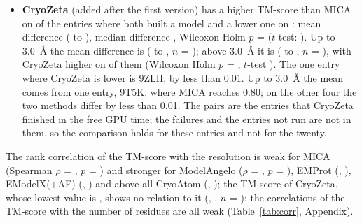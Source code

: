 \begin{itemize}
\item \textbf{CryoZeta} (added after the first version) has a higher TM-score than MICA on \HigherTmCryozeta{} of the \NPairsTmCryozeta{} entries where both built a model and a lower one on \LowerTmCryozeta{}: mean difference \DiffTmCryozeta{} (\DiffLoTmCryozeta{} to \DiffHiTmCryozeta{}), median difference \MedDiffTmCryozeta{}, Wilcoxon Holm $p$ = \PwHolmTmCryozeta{} ($t$-test: \PtHolmTmCryozeta{}). Up to 3.0~\AA{} the mean difference is \DiffTmCryozetaLow{} (\DiffLoTmCryozetaLow{} to \DiffHiTmCryozetaLow{}, $n$ = \NPairsTmCryozetaLow{}); above 3.0~\AA{} it is \DiffTmCryozetaHigh{} (\DiffLoTmCryozetaHigh{} to \DiffHiTmCryozetaHigh{}, $n$ = \NPairsTmCryozetaHigh{}), with CryoZeta higher on \HigherTmCryozetaHigh{} of them (Wilcoxon Holm $p$ = \PwHolmTmCryozetaHigh{}, $t$-test \PtHolmTmCryozetaHigh{}). The one entry where CryoZeta is lower is 9ZLH, by less than 0.01. Up to 3.0~\AA{} the mean comes from one entry, 9T5K, where MICA reaches 0.80; on the other four the two methods differ by less than 0.01. The pairs are the entries that CryoZeta finished in the free GPU time; the \NFailedCryozeta{} failures and the \NNotRunCryozeta{} entries not run are not in them, so the comparison holds for these entries and not for the twenty.
\end{itemize}
The rank correlation of the TM-score with the resolution is weak for MICA (Spearman $\rho$ = \RhoResTmMica{}, $p$ = \RhoPResTmMica{}) and stronger for ModelAngelo ($\rho$ = \RhoResTmAngelo{}, $p$ = \RhoPResTmAngelo{}), EMProt (\RhoResTmEmprot{}, \RhoPResTmEmprot{}), EModelX(+AF) (\RhoResTmEmodelx{}, \RhoPResTmEmodelx{}) and above all CryoAtom (\RhoResTmCryoatom{}, \RhoPResTmCryoatom{}); the TM-score of CryoZeta, whose lowest value is \TmMinCryozeta{}, shows no relation to it (\RhoResTmCryozeta{}, \RhoPResTmCryozeta{}, $n$ = \RhoNResTmCryozeta{}); the correlations of the TM-score with the number of residues are all weak (Table~\ref{tab:corr}, Appendix).

\begin{table}[t]
\centering\small
\caption{Paired comparison of the TM-score with MICA on the entries where both methods built a model (method minus MICA; 95\,\% bootstrap CI of the mean difference; two-sided Wilcoxon signed-rank test and paired $t$-test, both with Holm correction over the \NFamilyWord{} methods; counts of entries where the method is higher, lower or equal).}
\label{tab:paired}
\fitwidth{}
\end{table}

